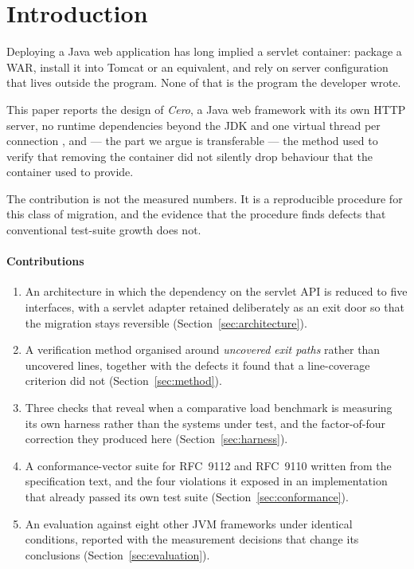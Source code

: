 \documentclass[preprint,12pt]{elsarticle}
\begin{document}
\section{Introduction}
\label{sec:introduction}

Deploying a Java web application has long implied a servlet container: package a
WAR, install it into Tomcat or an equivalent, and rely on server configuration
that lives outside the program. None of that is the program the developer wrote.

This paper reports the design of \emph{Cero}, a Java web framework with its own
HTTP server, no runtime dependencies beyond the JDK and one virtual thread per
connection \cite{jep444}, and --- the part we argue is transferable --- the
method used to verify that removing the container
did not silently drop behaviour that the container used to provide.

The contribution is not the measured numbers. It is a reproducible procedure for
this class of migration, and the evidence that the procedure finds defects that
conventional test-suite growth does not.

\paragraph{Contributions}
\begin{enumerate}
  \item An architecture in which the dependency on the servlet API is reduced to
        five interfaces, with a servlet adapter retained deliberately as an exit
        door so that the migration stays reversible (Section~\ref{sec:architecture}).
  \item A verification method organised around \emph{uncovered exit paths}
        rather than uncovered lines, together with the defects it found that a
        line-coverage criterion did not (Section~\ref{sec:method}).
  \item Three checks that reveal when a comparative load benchmark is measuring
        its own harness rather than the systems under test, and the factor-of-four
        correction they produced here (Section~\ref{sec:harness}).
  \item A conformance-vector suite for RFC~9112 and RFC~9110 written from the
        specification text, and the four violations it exposed in an
        implementation that already passed its own test suite
        (Section~\ref{sec:conformance}).
  \item An evaluation against eight other JVM frameworks under identical
        conditions, reported with the measurement decisions that change its
        conclusions (Section~\ref{sec:evaluation}).
\end{enumerate}
\end{document}
